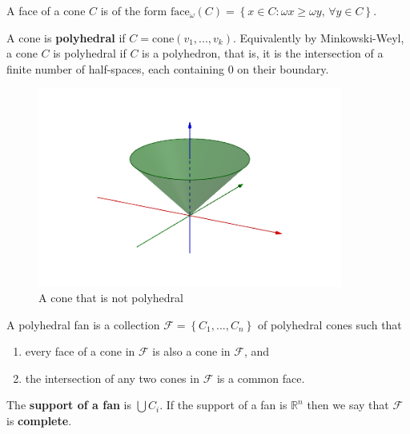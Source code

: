 \documentclass[a4paper, 11pt]{article}
\begin{document}
\begin{defi}
  A face of a cone \( C \) is of the form \( \mathrm{face}_{\omega}(C) = \left\{ x \in C: \omega x \geq \omega y, \, \forall y \in C \right\} \).
\end{defi}

\begin{defi}
  A cone is \textbf{polyhedral} if \( C = \mathrm{cone}(v_1,...,v_k) \). Equivalently by Minkowski-Weyl, a cone \( C \) is polyhedral if \( C \) is a polyhedron, that is, it is the intersection of a finite number of half-spaces, each containing \( 0 \) on their boundary.
\end{defi}

\begin{figure}[H]
  \centering
  \includegraphics[width=10cm]{assets/not-polyhedral-cone.png}
  \caption{A cone that is not polyhedral}
\end{figure}

\begin{defi}
  A polyhedral fan is a collection \( \mathcal{F} = \left\{ C_1,...,C_n \right\} \) of polyhedral cones such that 
  \begin{enumerate}
    \item every face of a cone in \( \mathcal{F} \) is also a cone in \( \mathcal{F} \), and 
    \item the intersection of any two cones in \( \mathcal{F} \) is a {common} face.
  \end{enumerate}
  The \textbf{support of a fan} is \( \bigcup C_i \). If the support of a fan is \( \mathbb R^n \) then we say that \( \mathcal{F} \) is \textbf{complete}.
\end{defi}


\printindex
\end{document}
